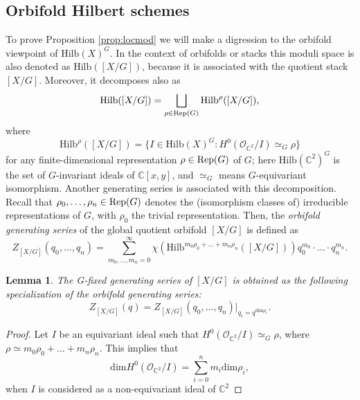 \documentclass[11pt,a4paper]{amsart}
\newtheorem{lemma}[theorem]{Lemma}
\theoremstyle{definition}
\newcommand{\SC}{\mathbb{C}}                    %
\begin{document}
\subsection{Orbifold Hilbert schemes}

To prove Proposition \ref{prop:locmod} we will make a digression to the orbifold viewpoint of $\mathrm{Hilb}(X)^G$. In the context of orbifolds or stacks this moduli space is also denoted as $\mathrm{Hilb}([X/G])$, because it is associated with the quotient stack $[X/G]$. Moreover, it decomposes also as
\[ \mathrm{Hilb}([X/G])=\bigsqcup_{\rho \in {\mathop{\rm Rep}}(G)}\mathrm{Hilb}^{\rho}([X/G]),\]
where
\[\mathrm{Hilb}^{\rho}([X/G])=  \{ I \in \mathrm{Hilb}(X)^G \colon H^0(\mathcal{O}_{\SC^2}/I) \simeq_G \rho \}\]
for any finite-dimensional representation $\rho\in {\mathop{\rm Rep}}(G)$ of $G$;
here $\mathrm{Hilb}(\SC^2)^G$ is the set of $G$-invariant ideals of $\SC[x,y]$, and $\simeq_G$ means $G$-equivariant isomorphism. 
Another generating series is associated with this decomposition. Recall that $\rho_0,\ldots,\rho_n\in\mathop{\rm Rep}(G)$ denotes the (isomorphism classes of) irreducible representations of $G$, with $\rho_0$ the trivial representation. Then, the \textit{orbifold generating series} of the global quotient orbifold $[X/G]$ is defined as
\[Z_{[X/G]}(q_0,\ldots, q_n)= \sum_{m_0,\dots,m_n=0}^\infty \chi\left(\mathrm{Hilb}^{m_0 \rho_0 + \ldots +m_n \rho_n}([X/G]) \right)   q_0^{m_0}\cdot \ldots \cdot q_n^{m_n}.\]
\begin{lemma} The G-fixed generating series of $[X/G]$ is obtained as the following specialization of the orbifold generating series:
 \[Z_{[X/G]}(q)=Z_{[X/G]}(q_0,\ldots, q_n)\Big|_{q_i=q^{\mathrm{dim} \rho_i}}.\]
\end{lemma}
\begin{proof}
Let $I$ be an equivariant ideal such that $H^0(\mathcal{O}_{\SC^2}/I) \simeq_G \rho$, where $\rho \simeq m_0 \rho_0 + \ldots +m_n \rho_n$. This implies that
\[\mathrm{dim} H^0(\mathcal{O}_{\SC^2}/I) = \sum_{i=0}^{n} m_i \mathrm{dim} \rho_i, \]
when $I$ is considered as a non-equivariant ideal of $\SC^2$
\end{proof}
\end{document}
